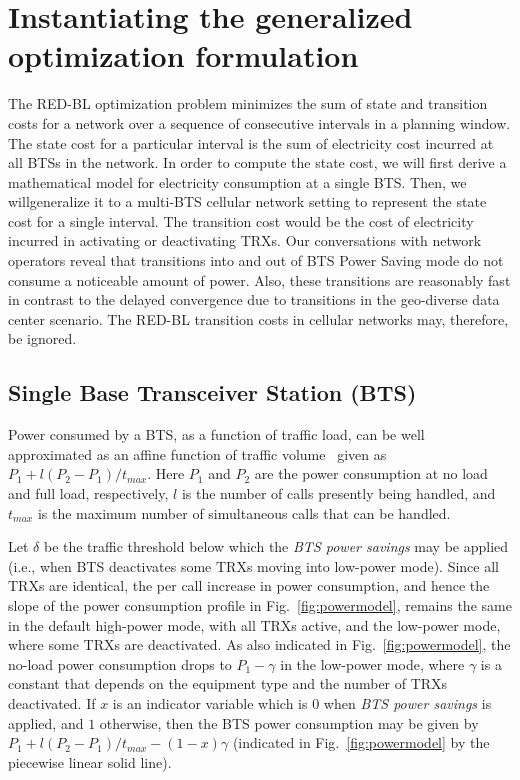 \section{Instantiating the generalized optimization formulation} %
\label{sec:case2:instantiate}
The RED-BL optimization problem minimizes the sum of state and transition costs for a network over a sequence of consecutive intervals in a planning window. The state cost for a particular interval is the sum of electricity cost incurred at all BTSs in the network. In order to compute the state cost, we will first derive a mathematical model for electricity consumption at a single BTS. Then, we willgeneralize it to a multi-BTS cellular network setting to represent the state cost for a single interval. The transition cost would be the cost of electricity incurred in activating or deactivating TRXs. Our conversations with network operators reveal that transitions into and out of BTS Power Saving mode do not consume a noticeable amount of power. Also, these transitions are reasonably fast in contrast to the delayed convergence due to transitions in the geo-diverse data center scenario. The RED-BL transition costs in cellular networks may, therefore, be ignored.

\subsection{Single Base Transceiver Station (BTS)}
\label{sec:case2:instantiate:single-cell}
Power consumed by a BTS, as a function of traffic load, can be
well approximated as an affine function  of traffic volume~\cite{Peng:2011:BTSSaving:Mobicom} given as
$P_1+l(P_2-P_1)/t_{max}$. Here $P_1$ and $P_2$ are the power
consumption at no load and full load, respectively, $l$ is the
number of calls presently being handled, and $t_{max}$ is the
maximum number of simultaneous calls that can be handled.

Let $\delta$ be the traffic threshold below which the \textit{BTS power savings} may be applied (i.e., when BTS deactivates some TRXs moving into low-power mode). Since all TRXs are identical, the per call increase in power consumption, and hence the slope of the power consumption profile in Fig.~\ref{fig:powermodel}, remains the same in the default high-power mode, with all TRXs active, and the low-power mode, where some TRXs are deactivated. As also indicated in Fig.~\ref{fig:powermodel}, the no-load power consumption drops to $P_1-\gamma$ in the low-power mode, where $\gamma$ is a constant that depends on the equipment type and the number of TRXs deactivated. If $x$ is an indicator variable which is $0$ when \textit{BTS power savings} is applied, and $1$ otherwise, then the BTS power consumption may be given by $P_1+l(P_2-P_1)/t_{max} - (1-x)\gamma$ (indicated in Fig.~\ref{fig:powermodel} by the piecewise linear solid line).


